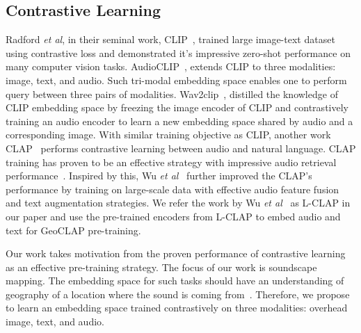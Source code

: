 \documentclass{bmvc2k}
\def\etal{\emph{et al}\bmvaOneDot}
\begin{document}
\subsection{Contrastive Learning}
Radford \etal, in their seminal work, CLIP~\cite{radford2021learning}, trained large image-text dataset using contrastive loss and demonstrated it's impressive zero-shot performance on many computer vision tasks. AudioCLIP~\cite{guzhov2022audioclip}, extends CLIP to three modalities: image, text, and audio. Such tri-modal embedding space enables one to perform query between three pairs of modalities. Wav2clip~\cite{wu2022wav2clip}, distilled the knowledge of CLIP embedding space by freezing the image encoder of CLIP and contrastively training an audio encoder to learn a new embedding space shared by audio and a corresponding image. With similar training objective as CLIP, another work CLAP~\cite{elizalde2023clap} performs contrastive learning between audio and natural language. CLAP training has proven to be an effective strategy with impressive audio retrieval performance~\cite{deshmukh2022audio}. Inspired by this, Wu \etal~\cite{laionclap2023} further improved the CLAP’s performance by training on large-scale data with effective audio feature fusion and text augmentation strategies. We refer the work by  Wu \etal~\cite{laionclap2023} as L-CLAP in our paper and use the pre-trained encoders from L-CLAP to embed audio and text for GeoCLAP pre-training.

Our work takes motivation from the proven performance of contrastive learning as an effective pre-training strategy. The focus of our work is soundscape mapping. The embedding space for such tasks should have an understanding of geography of a location where the sound is coming from~\cite{ayush2021geography}. Therefore, we propose to learn an embedding space trained contrastively on three modalities: overhead image, text, and audio.
\end{document}
